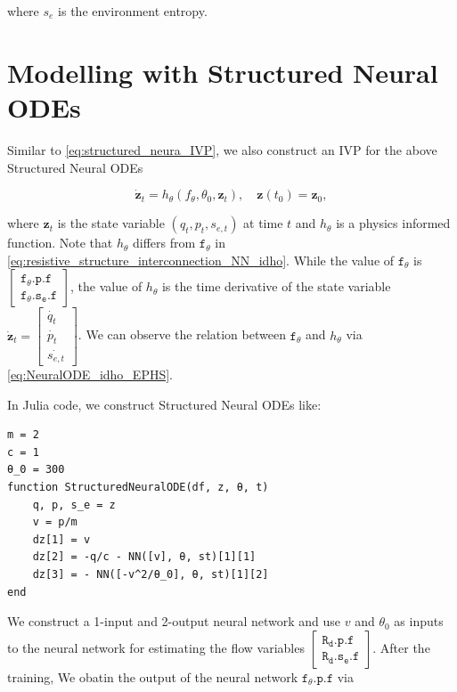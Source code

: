 \documentclass[
	parskip, 			   %
	twoside, 			   %
	DIV=14, 			   %
	BCOR=15.0mm, 		   %
	headsepline, 		   %
	open=right, 		   %
	captions=tableheading, %
	bibliography=totoc,    %
	numbers=noenddot       %
]{scrreprt}
\begin{document}
where $s_e$ is the environment entropy.


\section{Modelling with Structured Neural ODEs}

Similar to \ref{eq:structured_neura_IVP}, we also construct an IVP for the above Structured Neural ODEs

\begin{equation}
    \label{eq:structured_neural_EPHS_IVP}
    \dot{\mathbf{z}}_t = h_{\theta}(f_{\theta}, \theta_0, \mathbf{z}_t), \quad \mathbf{z}(t_{0}) = \mathbf{z}_{0},
\end{equation}

where $\mathbf{z}_t$ is the state variable $(q_t, p_t, s_{e,t})$ at time $t$ and $h_{\theta}$ is a physics informed function. Note that $h_{\theta}$ differs from $\mathtt{f_{\theta}}$ in \ref{eq:resistive_structure_interconnection_NN_idho}. While the value of $\mathtt{f_{\theta}}$ is $ \left[\begin{array}{l}\mathtt{f_{\theta}.p.f} \\ \mathtt{f_{\theta}.s_{e}.f}\end{array}\right]$, the value of $h_{\theta}$ is the time derivative of the state variable $\dot{\mathbf{z}}_t = \begin{bmatrix}\dot{q_t}\\ \dot{p_t}\\ \dot{s_{e,t}}\end{bmatrix}$. We can observe the relation between $\mathtt{f_{\theta}}$ and $h_{\theta}$ via \ref{eq:NeuralODE_idho_EPHS}.

In Julia code, we construct Structured Neural ODEs like:

\begin{verbatim}
m = 2
c = 1
θ_0 = 300
function StructuredNeuralODE(df, z, θ, t)
    q, p, s_e = z
    v = p/m
    dz[1] = v
    dz[2] = -q/c - NN([v], θ, st)[1][1]
    dz[3] = - NN([-v^2/θ_0], θ, st)[1][2]
end
\end{verbatim}

We construct a 1-input and 2-output neural network and use $v$ and $\theta_0$ as inputs to the neural network for estimating the flow variables $\left[\begin{array}{l}\mathtt{R_{d}.p.f} \\ \mathtt{R_{d}.s_{e}.f}\end{array}\right]$. After the training, We obatin the output of the neural network $\mathtt{f_{\theta}.p.f}$ via
\end{document}
